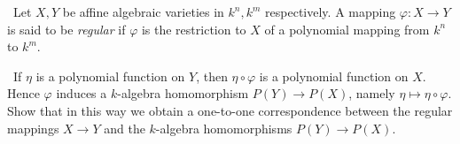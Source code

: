 \begin{enumerate}
    \quad\, Let $X, Y$ be affine algebraic varieties in $k^n, k^m$ respectively. A mapping $\varphi \colon X \to Y$ is said to be \emph{regular} if $\varphi$ is the restriction to $X$ of a polynomial mapping from $k^n$ to $k^m$.

    \quad\, If $\eta$ is a polynomial function on $Y$, then $\eta \circ \varphi$ is a polynomial function on $X$. Hence $\varphi$ induces a $k$-algebra homomorphism $P(Y) \to P(X)$, namely $\eta \mapsto \eta \circ \varphi$. Show that in this way we obtain a one-to-one correspondence between the regular mappings $X \to Y$ and the $k$-algebra homomorphisms $P(Y) \to P(X)$.
\end{enumerate}
